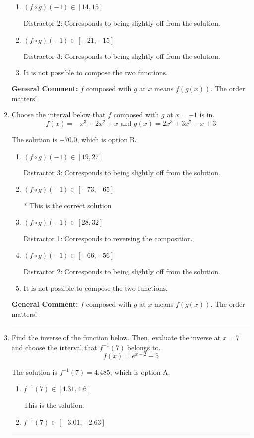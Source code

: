 \documentclass{extbook}[14pt]
\newcommand{\litem}[1]{\item #1

\rule{\textwidth}{0.4pt}}
\begin{document}
\begin{enumerate}
{\begin{enumerate}[label=\Alph*.]
* This is the correct solution
\item \( (f \circ g)(-1) \in [14, 15] \)

 Distractor 2: Corresponds to being slightly off from the solution.
\item \( (f \circ g)(-1) \in [-21, -15] \)

 Distractor 3: Corresponds to being slightly off from the solution.
\item \( \text{It is not possible to compose the two functions.} \)


\end{enumerate}

\textbf{General Comment:} $f$ composed with $g$ at $x$ means $f(g(x))$. The order matters!
}
\litem{
Choose the interval below that $f$ composed with $g$ at $x=-1$ is in.
\[ f(x) = -x^{3} +2 x^{2} +x \text{ and } g(x) = 2x^{3} +3 x^{2} -x + 3 \]

The solution is \( -70.0 \), which is option B.\begin{enumerate}[label=\Alph*.]
\item \( (f \circ g)(-1) \in [19, 27] \)

 Distractor 3: Corresponds to being slightly off from the solution.
\item \( (f \circ g)(-1) \in [-73, -65] \)

* This is the correct solution
\item \( (f \circ g)(-1) \in [28, 32] \)

 Distractor 1: Corresponds to reversing the composition.
\item \( (f \circ g)(-1) \in [-66, -56] \)

 Distractor 2: Corresponds to being slightly off from the solution.
\item \( \text{It is not possible to compose the two functions.} \)


\end{enumerate}

\textbf{General Comment:} $f$ composed with $g$ at $x$ means $f(g(x))$. The order matters!
}
\litem{
Find the inverse of the function below. Then, evaluate the inverse at $x = 7$ and choose the interval that $f^{-1}(7)$ belongs to.
\[ f(x) = e^{x-2}-5 \]

The solution is \( f^{-1}(7) = 4.485 \), which is option A.\begin{enumerate}[label=\Alph*.]
\item \( f^{-1}(7) \in [4.31, 4.6] \)

 This is the solution.
\item \( f^{-1}(7) \in [-3.01, -2.63] \)


\end{enumerate}}
\end{enumerate}
\end{document}
